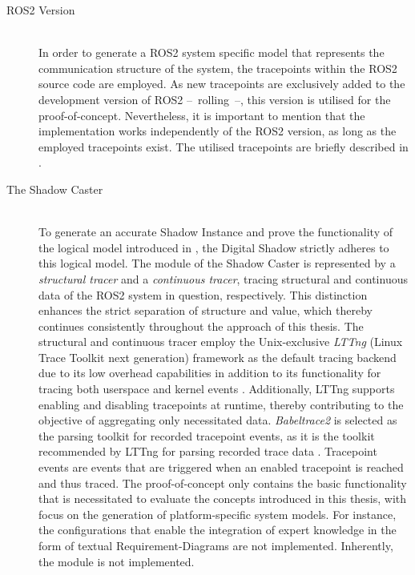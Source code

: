     \begin{description}
        \item[ROS2 Version] \hfill \\
            In order to generate a ROS2 system specific model that represents the communication structure of the system, the tracepoints within the ROS2 source code are employed. As new tracepoints are exclusively added to the development version of ROS2 --~rolling~--, this version is utilised for the proof-of-concept. Nevertheless, it is important to mention that the implementation works independently of the ROS2 version, as long as the employed tracepoints exist. The utilised tracepoints are briefly described in  .\newline
        \item[The Shadow Caster] \hfill \\
            To generate an accurate Shadow Instance and prove the functionality of the logical model introduced in , the Digital Shadow strictly adheres to this logical model. The  module of the Shadow Caster is represented by a \emph{structural tracer} and a \emph{continuous tracer}, tracing structural and continuous data of the ROS2 system in question, respectively. This distinction enhances the strict separation of structure and value, which thereby continues consistently throughout the approach of this thesis.\newline
            The structural and continuous tracer employ the Unix-exclusive \emph{LTTng} (Linux Trace Toolkit next generation) framework \cite{website:lttng} as the default tracing backend due to its low overhead capabilities in addition to its functionality for tracing both userspace and kernel events \cite{website:lttng}\cite{lttng}. Additionally, LTTng supports enabling and disabling tracepoints at runtime, thereby contributing to the objective of aggregating only necessitated data.\newline
            \emph{Babeltrace2} \cite{website:babeltrace} is selected as the parsing toolkit for recorded tracepoint events, as it is the toolkit recommended by LTTng for parsing recorded trace data \cite{website:lttng}. Tracepoint events are events that are triggered when an enabled tracepoint is reached and thus traced.\newline
            The proof-of-concept only contains the basic functionality that is necessitated to evaluate the concepts introduced in this thesis, with focus on the generation of platform-specific system models. For instance, the configurations that enable the integration of expert knowledge in the form of textual Requirement-Diagrams are not implemented. Inherently, the  module is not implemented.

\end{description}
